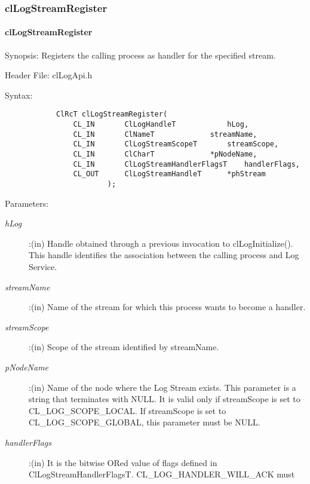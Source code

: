 \begin{flushleft}
\subsubsection{clLogStreamRegister}
\hypertarget{pagelog112}{}\paragraph{cl\-Log\-Stream\-Register}\label{pagelog112}
\begin{Desc}
\item[Synopsis:] Registers the calling process as handler for the specified stream.\end{Desc}
\begin{Desc}
\item[Header File:] clLogApi.h \end{Desc}
\begin{Desc}
\item[Syntax:]
\footnotesize\begin{verbatim}        	
			ClRcT clLogStreamRegister(
				CL_IN		ClLogHandleT			hLog,
				CL_IN		ClNameT				streamName,
				CL_IN		ClLogStreamScopeT		streamScope,
				CL_IN		ClCharT				*pNodeName,
				CL_IN		ClLogStreamHandlerFlagsT	handlerFlags,
				CL_OUT		ClLogStreamHandleT		*phStream
						);
\end{verbatim}
\normalsize
\end{Desc}
\begin{Desc}
\item[Parameters:] \begin{description}
\item[{\em hLog}]:(in) Handle obtained through a previous invocation to clLogInitialize(). This handle identifies the association between the calling
process and Log Service.
\item[{\em streamName}]:(in) Name of the stream for which this process wants to become a handler.
\item[{\em streamScope}]:(in) Scope of the stream identified by streamName.
\item[{\em *pNodeName}]:(in) Name of the node where the Log Stream exists. This parameter is a string that terminates with NULL. It is valid only if 
streamScope is set to CL\_\-LOG\_\-SCOPE\_\-LOCAL. If streamScope is set to CL\_\-LOG\_\-SCOPE\_\-GLOBAL, this parameter must be NULL.
\item[{\em handlerFlags}]:(in) It is the bitwise ORed value of flags defined in ClLogStreamHandlerFlagsT. CL\_\-LOG\_\-HANDLER\_\-WILL\_\-ACK must 

\end{description}
\end{Desc}
\end{flushleft}
